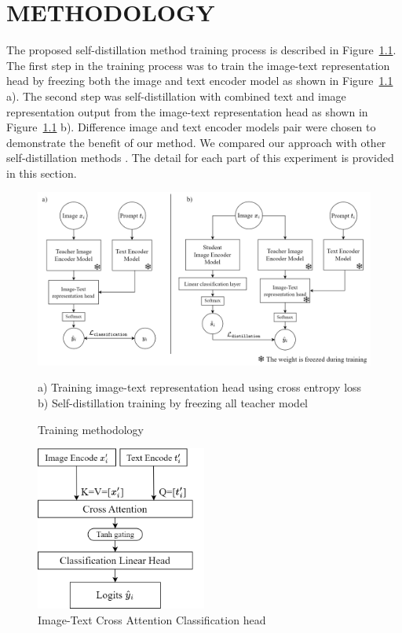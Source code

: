 \chapter{METHODOLOGY}

The proposed self-distillation method training process is described in Figure~\ref{fig:methodology}.
The first step in the training process was to train the image-text representation head by freezing both the image and text encoder model as shown in Figure~\ref{fig:methodology} a).
The second step was self-distillation with combined text and image representation output from the image-text representation head as shown in Figure~\ref{fig:methodology} b).
Difference image and text encoder models pair were chosen to demonstrate the benefit of our method.
We compared our approach with other self-distillation methods .
The detail for each part of this experiment is provided in this section.

\begin{figure}[h]
    \caption{Training methodology}
    \label{fig:methodology}
    \begin{center}
        \includegraphics[width=1\textwidth]{Images/Methodology.png}
    \end{center}
    \small a) Training image-text representation head using cross entropy loss b) Self-distillation training by freezing all teacher model
\end{figure}

\begin{figure}[h]
    \caption{Image-Text Cross Attention Classification head}
    \label{fig:cross_attention}
    \centering
    \includegraphics[width=0.5\textwidth]{Images/CrossAttention.png}
\end{figure}

